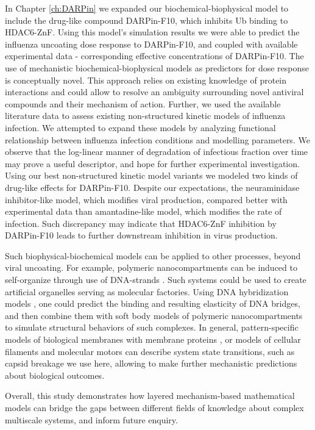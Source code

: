 In Chapter \ref{ch:DARPin} we expanded our biochemical-biophysical model to include the drug-like compound DARPin-F10, which inhibits Ub binding to HDAC6-ZnF. Using this model's simulation results we were able to predict the influenza uncoating dose response to DARPin-F10, and coupled with available experimental data - corresponding effective concentrations of DARPin-F10. The use of mechanistic biochemical-biophysical models as predictors for dose response is conceptually novel. This approach relies on existing knowledge of protein interactions and could allow to resolve an ambiguity surrounding novel antiviral compounds and their mechanism of action. Further, we used the available literature data \cite{rudiger2019multiscale, schulze2009infection} to assess existing non-structured kinetic models of influenza infection. We attempted to expand these models by analyzing functional relationship between influenza infection conditions and modelling parameters. We observe that the log-linear manner of degradation of infectious fraction over time may prove a useful descriptor, and hope for further experimental investigation. Using our best non-structured kinetic model variants we modeled two kinds of drug-like effects for DARPin-F10. Despite our expectations, the neuraminidase inhibitor-like model, which modifies viral production, compared better with experimental data than amantadine-like model, which modifies the rate of infection. Such discrepancy may indicate that HDAC6-ZnF inhibition by DARPin-F10 leads to further downstream inhibition in virus production.

Such biophysical-biochemical models can be applied to other processes, beyond viral uncoating. For example, polymeric nanocompartments can be induced to self-organize through use of DNA-strands \cite{liu2016dna}. Such systems could be used to create artificial organelles serving as molecular factories. Using DNA hybridization models \cite{karamasioti2019computational}, one could predict the binding and resulting elasticity of DNA bridges, and then combine them with soft body models of polymeric nanocompartments to simulate structural behaviors of such complexes. In general, pattern-specific models of biological membranes \cite{cheng2019biological} with membrane proteins \cite{ayton2009systematic}, or models of cellular filaments and molecular motors \cite{chen2019remote} can describe system state transitions, such as capsid breakage we use here, allowing to make further mechanistic predictions about biological outcomes. 

Overall, this study demonstrates how layered mechanism-based mathematical models can bridge the gaps between different fields of knowledge about complex multiscale systems, and inform future enquiry.